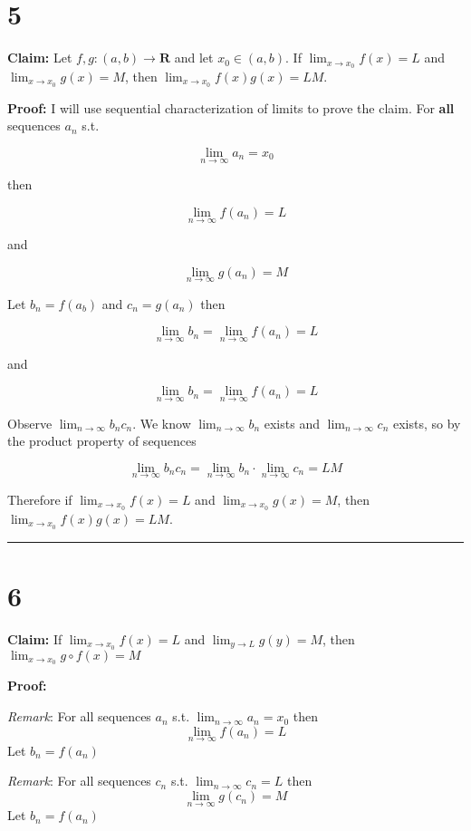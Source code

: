 \documentclass[10pt,letterpaper]{article}
\newcommand\R{\mathbf{R}}
\newcommand\ds{\displaystyle}
\newcommand\qedsym{\hfill \rule{2mm}{2mm}}
\begin{document}
\section*{5}

\textbf{Claim:} Let $f,g:(a, b)\rightarrow\R$ and let $x_0\in(a, b)$. If $\ds\lim_{x\to x_0} f(x) = L$ and $\ds\lim_{x\to x_0} g(x) = M$, then $\ds\lim_{x\to x_0} f(x)g(x) = LM$.

\medskip

\textbf{Proof:} I will use sequential characterization of limits to prove the claim. For \textbf{all} sequences $a_n$ s.t.

\[\ds\lim_{n\to\infty} a_n = x_0\]

then 

\[\ds\lim_{n\to\infty}f(a_n) = L\]

and

\[\ds\lim_{n\to\infty}g(a_n) = M\]

Let $b_n = f(a_b)$ and $c_n = g(a_n)$ then

\[\ds\lim_{n\to\infty}b_n = \ds\lim_{n\to\infty}f(a_n) = L\]

and

\[\ds\lim_{n\to\infty}b_n = \ds\lim_{n\to\infty}f(a_n) = L\]

Observe $\ds\lim_{n\to\infty}b_nc_n$. We know $\ds\lim_{n\to\infty}b_n$ exists and $\ds\lim_{n\to\infty}c_n$ exists, so by the product property of sequences

\[\ds\lim_{n\to\infty}b_nc_n = \ds\lim_{n\to\infty}b_n \cdot \ds\lim_{n\to\infty}c_n = LM\]

Therefore if $\ds\lim_{x\to x_0} f(x) = L$ and $\ds\lim_{x\to x_0} g(x) = M$, then $\ds\lim_{x\to x_0} f(x)g(x) = LM$.

\qedsym

\section*{6}


\textbf{Claim:} If $\ds\lim_{x\to x_0} f(x) = L$ and $\ds\lim_{y\to L} g(y) = M$, then $\ds\lim_{x\to x_0} g \circ f(x) = M$

\medskip

\textbf{Proof:}

\textit{Remark}: For all sequences $a_n$ s.t. $\ds\lim_{n\to\infty} a_n = x_0$ then 
\[\lim_{n\to\infty} f(a_n) = L\]
Let $b_n = f(a_n)$

\textit{Remark}: For all sequences $c_n$ s.t. $\ds\lim_{n\to\infty} c_n = L$ then 
\[\lim_{n\to\infty} g(c_n) = M\]
Let $b_n = f(a_n)$
\end{document}
